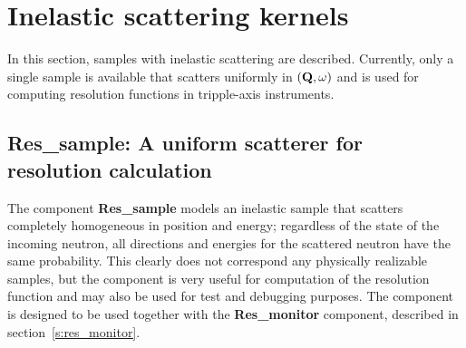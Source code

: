 
\chapter{Inelastic scattering kernels}
\label{s:inelastic}

In this section, samples with inelastic scattering are
described. Currently, only a single sample is available that scatters
uniformly in $({\bf Q}, \omega)$ and is used for computing resolution
functions in tripple-axis instruments.

\section{Res\_sample: A uniform scatterer for resolution calculation}
\label{s:res_sample}

The component \textbf{Res\_sample} models an inelastic sample that
scatters completely homogeneous in position and energy; regardless of
the state of the incoming neutron, all directions and energies for the
scattered neutron have the same probability. This clearly does not
correspond any physically realizable samples, but the component is very
useful for computation of the resolution function and may also be used
for test and debugging purposes. The component is designed to be used
together with the \textbf{Res\_monitor} component, described in
section~\ref{s:res_monitor}.

